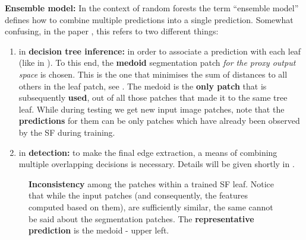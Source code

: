 \textbf{Ensemble model:} In the context of random forests the term ``ensemble model'' defines how to combine multiple predictions into a single prediction. Somewhat confusing, in the paper \cite{DollarICCV13edges}, this refers to two different things:
\begin{enumerate}
 \item{in {\bf decision tree inference:}} in order to associate a prediction with each leaf (like in ). 
 To this end, the {\bf medoid} segmentation patch \textit{for the proxy output space} is chosen. This is the one that minimises the sum of distances to all others in the leaf patch, see . The medoid is the {\bf only patch} that is subsequently {\bf used}, out of all those patches that made it to the same tree leaf. 
 While during testing we get new input image patches, note that the {\bf predictions} for them can be only patches which have already been observed by the SF during training. %
 \item{in {\bf detection:}} to make the final edge extraction, a means of combining multiple overlapping decisions is necessary. Details will be given shortly in .
\end{enumerate}

\begin{figure}[t]
\centering
\caption[Inconsistency among the patches within a trained SF leaf]{{\bf Inconsistency} among the patches within a trained SF leaf. Notice that while the input patches (and consequently, the features computed based on them), are sufficiently similar, the same cannot be said about the segmentation patches. The {\bf representative prediction} is the medoid - upper left.}
\label{fig:srf-leaf}
\end{figure}

